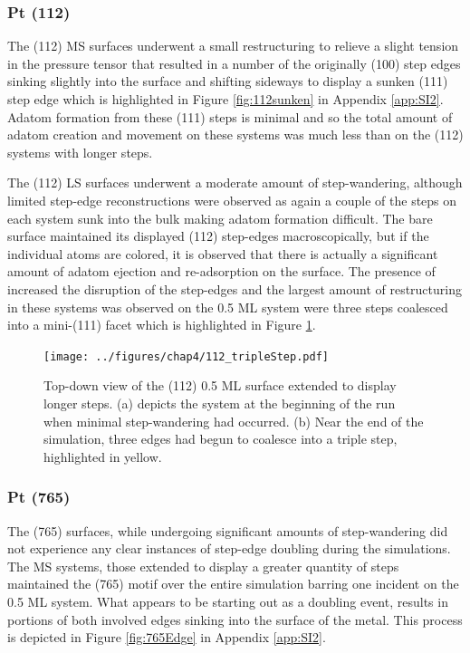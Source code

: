 \subsubsection{Pt (112)}
The (112) MS surfaces underwent a small restructuring to relieve a slight
tension in the pressure tensor that resulted in a number of the
originally (100) step edges sinking slightly into the surface and shifting
sideways to display a sunken (111) step edge which is highlighted in Figure
\ref{fig:112sunken} in Appendix \ref{app:SI2}.  Adatom formation from these (111)
steps is minimal and so the total amount of adatom creation and movement on
these systems was much less than on the (112) systems with longer steps. 

The (112) LS surfaces underwent a moderate amount of step-wandering, although
limited step-edge reconstructions were observed as again a couple of the steps
on each system sunk into the bulk making adatom formation difficult.  The bare
surface maintained its displayed (112) step-edges macroscopically, but if the
individual atoms are colored, it is observed that there is actually a
significant amount of adatom ejection and re-adsorption on the surface. The
presence of  increased the disruption of the step-edges and the largest
amount of restructuring in these systems was observed on the 0.5 ML system were
three steps coalesced into a mini-(111) facet which is highlighted in Figure
\ref{fig:tripleStep}.

\begin{figure}
\centering
  \texttt{[image: ../figures/chap4/112\_tripleStep.pdf]}
  \caption{Top-down view of the (112) 0.5 ML surface extended to display longer
steps. (a) depicts the system at the beginning of the run when minimal
step-wandering had occurred. (b) Near the end of the simulation, three edges
had begun to coalesce into a triple step, highlighted in yellow.}
  \label{fig:tripleStep}
\end{figure}

\subsubsection{Pt (765)}
The (765) surfaces, while undergoing significant amounts of step-wandering did
not experience any clear instances of step-edge doubling during the
simulations. The MS systems, those extended to display a greater quantity of
steps maintained the (765) motif over the entire simulation barring one
incident on the 0.5 ML system. What appears to be starting out as a doubling
event, results in portions of both involved edges sinking into the surface of
the metal. This process is depicted in Figure \ref{fig:765Edge} in Appendix \ref{app:SI2}.


